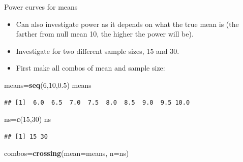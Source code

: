 \documentclass[
  ignorenonframetext,
]{beamer}
\newenvironment{Shaded}{\begin{snugshade}}{\end{snugshade}}
\newcommand{\DataTypeTok}[1]{\textcolor[rgb]{0.13,0.29,0.53}{#1}}
\newcommand{\DecValTok}[1]{\textcolor[rgb]{0.00,0.00,0.81}{#1}}
\newcommand{\FloatTok}[1]{\textcolor[rgb]{0.00,0.00,0.81}{#1}}
\newcommand{\KeywordTok}[1]{\textcolor[rgb]{0.13,0.29,0.53}{\textbf{#1}}}
\newcommand{\NormalTok}[1]{#1}
\providecommand{\tightlist}{%
  \setlength{\itemsep}{0pt}\setlength{\parskip}{0pt}}
\begin{document}
\begin{frame}[fragile]{Power curves for means}
\protect\hypertarget{power-curves-for-means}{}

\begin{itemize}
\tightlist
\item
  Can also investigate power as it depends on what the true mean is (the
  farther from null mean 10, the higher the power will be).
\item
  Investigate for two different sample sizes, 15 and 30.
\item
  First make all combos of mean and sample size:
\end{itemize}

\begin{Shaded}
\begin{Highlighting}[]
\NormalTok{means=}\KeywordTok{seq}\NormalTok{(}\DecValTok{6}\NormalTok{,}\DecValTok{10}\NormalTok{,}\FloatTok{0.5}\NormalTok{)}
\NormalTok{means}
\end{Highlighting}
\end{Shaded}

\begin{verbatim}
## [1]  6.0  6.5  7.0  7.5  8.0  8.5  9.0  9.5 10.0
\end{verbatim}

\begin{Shaded}
\begin{Highlighting}[]
\NormalTok{ns=}\KeywordTok{c}\NormalTok{(}\DecValTok{15}\NormalTok{,}\DecValTok{30}\NormalTok{)}
\NormalTok{ns}
\end{Highlighting}
\end{Shaded}

\begin{verbatim}
## [1] 15 30
\end{verbatim}

\begin{Shaded}
\begin{Highlighting}[]
\NormalTok{combos=}\KeywordTok{crossing}\NormalTok{(}\DataTypeTok{mean=}\NormalTok{means, }\DataTypeTok{n=}\NormalTok{ns)}
\end{Highlighting}
\end{Shaded}

\end{frame}
\end{document}

